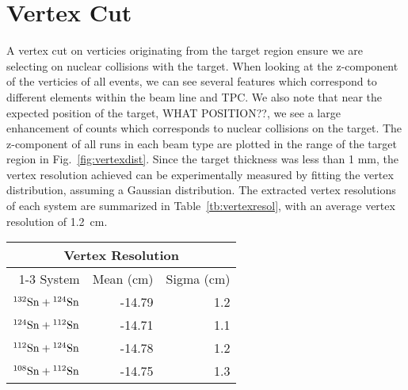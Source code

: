 \section{Vertex Cut}
A vertex cut on verticies originating from the target region ensure we are selecting on nuclear collisions with the target. When looking at the z-component of the verticies of all events, we can see several features which correspond to different elements within the beam line and TPC. We also note that near the expected position of the target, WHAT POSITION??, we see a large enhancement of counts which corresponds to nuclear collisions on the target. The z-component of all runs in each beam type are plotted in the range of the target region in Fig.~\ref{fig:vertexdist}. Since the target thickness was less than 1 mm, the vertex resolution achieved can be experimentally measured by fitting the vertex distribution, assuming a Gaussian distribution. The extracted vertex resolutions of each system are summarized in Table~\ref{tb:vertexresol}, with an average vertex resolution of \SI{1.2}{\centi\metre}.



\begin{table*}\centering
{}
\begin{tabular}{@{}rrr@{}}\toprule
\multicolumn{3}{c}{Vertex Resolution}\\
\cmidrule{1-3}
System & Mean (cm) & Sigma (cm) \\
\midrule
${}^{132}\mathrm{Sn} + {}^{124}\mathrm{Sn}$ & -14.79  & 1.2 \\
${}^{124}\mathrm{Sn} + {}^{112}\mathrm{Sn}$ & -14.71  & 1.1 \\
${}^{112}\mathrm{Sn} + {}^{124}\mathrm{Sn}$ & -14.78  & 1.2 \\
${}^{108}\mathrm{Sn} + {}^{112}\mathrm{Sn}$ & -14.75  & 1.3 \\ 
\bottomrule
\end{tabular}
\caption{Summary of measured verticies and their resolution.}
\label{tb:vertexresol}
\end{table*}



